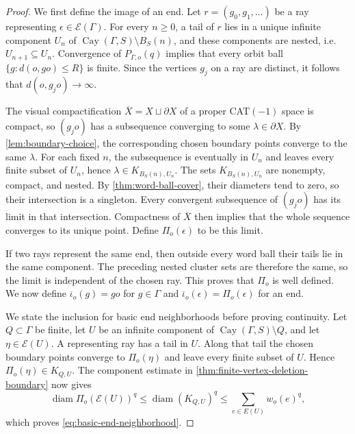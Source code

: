 \documentclass[11pt]{article}
\theoremstyle{definition}
\newcommand{\diam}{\operatorname{diam}}
\newcommand{\Cay}{\operatorname{Cay}}
\begin{document}
\begin{proof}
We first define the image of an end.  Let
$r=(g_0,g_1,\ldots)$ be a ray representing $\epsilon\in\mathcal E(\Gamma)$.  For every
$n\ge0$, a tail of $r$ lies in a unique infinite component $U_n$ of
$\Cay(\Gamma,S)\setminus B_S(n)$, and these components are nested, i.e.
$U_{n+1}\subseteq U_n$.  Convergence of $P_{\Gamma,o}(q)$ implies that every orbit ball
$\{g:d(o,go)\le R\}$ is finite.  Since the vertices $g_j$ on a ray are distinct, it follows
that $d(o,g_jo)\to\infty$.

The visual compactification $\overline X=X\sqcup\partial X$ of a proper CAT$(-1)$ space is
compact, so $(g_jo)$ has a subsequence converging to some $\lambda\in\partial X$.  By
\cref{lem:boundary-choice}, the corresponding chosen boundary points converge to the same $\lambda$.
For each fixed $n$, the subsequence is eventually in $U_n$ and leaves every finite subset of
$U_n$, hence $\lambda\in K_{B_S(n),U_n}$.  The sets
$K_{B_S(n),U_n}$ are nonempty, compact, and nested.  By
\cref{thm:word-ball-cover}, their diameters tend to zero, so their intersection is a singleton.
Every convergent subsequence of $(g_jo)$ has its limit in that intersection. Compactness of
$\overline X$ then implies that the whole sequence converges to its unique point.  Define
$\Pi_o(\epsilon)$ to be this limit.

If two rays represent the same end, then outside every word ball their tails lie in the same
component.  The preceding nested cluster sets are therefore the same, so the limit is
independent of the chosen ray.  This proves that $\Pi_o$ is well defined.  We now define
$\overline\iota_o(g)=go$ for $g\in\Gamma$ and
$\overline\iota_o(\epsilon)=\Pi_o(\epsilon)$ for an end.

We state the inclusion for basic end neighborhoods before proving continuity.  Let $Q\subset\Gamma$ be finite,
let $U$ be an infinite component of $\Cay(\Gamma,S)\setminus Q$, and let
$\eta\in\mathcal E(U)$.  A representing ray has a tail in $U$. Along that tail the chosen boundary points converge to $\Pi_o(\eta)$ and leave every finite subset of $U$.  Hence
$\Pi_o(\eta)\in K_{Q,U}$.  The component estimate in
\cref{thm:finite-vertex-deletion-boundary} now gives
\[
 \diam\Pi_o(\mathcal E(U))^q
 \le \diam(K_{Q,U})^q
 \le \sum_{e\in E(U)}w_o(e)^q,
\]
which proves \eqref{eq:basic-end-neighborhood}.


\end{proof}
\end{document}

